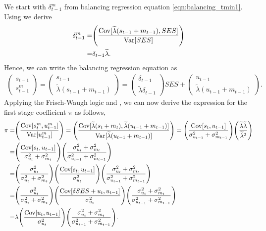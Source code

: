 We start with $\delta^m_{t-1}$ from balancing regression equation \eqref{eqn:balancing_tmin1}. Using  we derive
\begin{align}
    \delta^m_{t-1}=&\Bigg(\frac{\mathrm{Cov}[\widetilde{\lambda} (s_{t-1}+m_{t-1}), SES]}{\mathrm{Var}[SES]}\Bigg) \\ \notag
    =& \delta_{t-1} \widetilde{\lambda}. 
\end{align}
Hence, we can write the balancing regression equation as
\begin{align}
 \begin{pmatrix} s_{t-1} \\ s_{t-1}^m \end{pmatrix}= \begin{pmatrix} s_{t-1} \\ \widetilde{\lambda}(s_{t-1}+m_{t-1}) \end{pmatrix}= \begin{pmatrix} \delta_{t-1} \\ \widetilde{\lambda}\delta_{t-1}  \end{pmatrix} SES +  \begin{pmatrix}  u_{t-1}  \\  \widetilde{\lambda} (u_{t-1} + m_{t-1}) \end{pmatrix}.
\end{align} 
%
Applying the Frisch-Waugh logic and , we can now derive the expression for the first stage coefficient $\pi$ as follows,
\begin{align}\label{eqn:fs_noass}
    \notag
    \pi=&\Bigg(\frac{\mathrm{Cov}[s_{t}^m,u^m_{t-1}]}{\mathrm{Var}[u^m_{t-1}]}\Bigg)=
    \Bigg(\frac{\mathrm{Cov}[\widetilde{\lambda}(s_{t}+m_{t}),\widetilde{\lambda} (u_{t-1}+m_{t-1})]}{\mathrm{Var}[\widetilde{\lambda} (u_{t-1}+m_{t-1})]} \Bigg)  =\Bigg(\frac{\mathrm{Cov}[s_{t},u_{t-1}]}{\sigma_{u_{t-1}}^2+\sigma_{m_{t-1}}^2} \Bigg) \Bigg(\frac{\widetilde{\lambda}\widetilde{\lambda}}{\widetilde{\lambda}^2}\Bigg)\\
    =& \Bigg(\frac{\mathrm{Cov}[s_{t},u_{t-1}]}{\sigma_{u_{t}}^2+\sigma_{m_{t}}^2}\Bigg) \Bigg( \frac{\sigma_{u_{t}}^2+\sigma_{m_{t}}^2}{\sigma_{u_{t-1}}^2+\sigma_{m_{t-1}}^2}\Bigg) \\ \notag
     =& \Bigg(\frac{\sigma_{u_{t}}^2}{\sigma_{u_{t}}^2+\sigma_{m_{t}}^2}\Bigg)\Bigg( \frac{\mathrm{Cov}[s_{t},u_{t-1}]}{\sigma_{u_{t}}^2}\Bigg) \Bigg( \frac{\sigma_{u_{t}}^2+\sigma_{m_{t}}^2}{\sigma_{u_{t-1}}^2+\sigma_{m_{t-1}}^2}\Bigg) \\ \notag
    =& \Bigg(\frac{\sigma_{u_{t}}^2}{\sigma_{u_{t}}^2+\sigma_{m_{t}}^2}\Bigg)\Bigg( \frac{\mathrm{Cov}[\delta SES + u_{t},u_{t-1}]}{\sigma_{u_{t}}^2}\Bigg) \Bigg( \frac{\sigma_{u_{t}}^2+\sigma_{m_{t}}^2}{\sigma_{u_{t-1}}^2+\sigma_{m_{t-1}}^2}\Bigg)  \\ \notag
    =& \lambda \Bigg( \frac{\mathrm{Cov}[u_{t},u_{t-1}]}{\sigma_{u_{t}}^2}\Bigg) \Bigg( \frac{\sigma_{u_{t}}^2+\sigma_{m_{t}}^2}{\sigma_{u_{t-1}}^2+\sigma_{m_{t-1}}^2}\Bigg).
\end{align}
